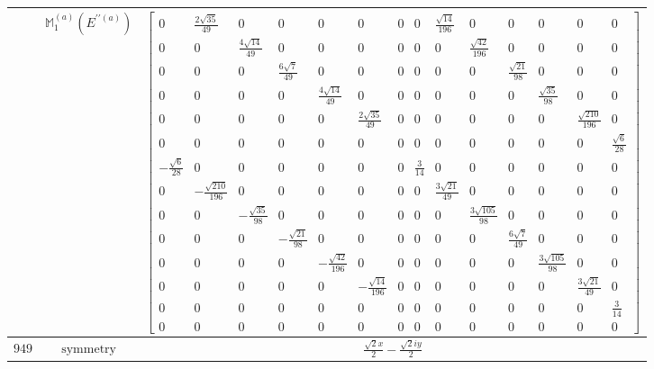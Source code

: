 \documentclass[fleqn,8pt,landscape]{jsarticle}
\begin{document}
\begin{longtable}{ccc}
$  $ & $ \mathbb{M}_{1}^{(a)}(E^{\prime\prime(a)}) $ & $ \begin{bmatrix} 0 & \frac{2 \sqrt{35}}{49} & 0 & 0 & 0 & 0 & 0 & 0 & \frac{\sqrt{14}}{196} & 0 & 0 & 0 & 0 & 0 \\ 0 & 0 & \frac{4 \sqrt{14}}{49} & 0 & 0 & 0 & 0 & 0 & 0 & \frac{\sqrt{42}}{196} & 0 & 0 & 0 & 0 \\ 0 & 0 & 0 & \frac{6 \sqrt{7}}{49} & 0 & 0 & 0 & 0 & 0 & 0 & \frac{\sqrt{21}}{98} & 0 & 0 & 0 \\ 0 & 0 & 0 & 0 & \frac{4 \sqrt{14}}{49} & 0 & 0 & 0 & 0 & 0 & 0 & \frac{\sqrt{35}}{98} & 0 & 0 \\ 0 & 0 & 0 & 0 & 0 & \frac{2 \sqrt{35}}{49} & 0 & 0 & 0 & 0 & 0 & 0 & \frac{\sqrt{210}}{196} & 0 \\ 0 & 0 & 0 & 0 & 0 & 0 & 0 & 0 & 0 & 0 & 0 & 0 & 0 & \frac{\sqrt{6}}{28} \\ - \frac{\sqrt{6}}{28} & 0 & 0 & 0 & 0 & 0 & 0 & \frac{3}{14} & 0 & 0 & 0 & 0 & 0 & 0 \\ 0 & - \frac{\sqrt{210}}{196} & 0 & 0 & 0 & 0 & 0 & 0 & \frac{3 \sqrt{21}}{49} & 0 & 0 & 0 & 0 & 0 \\ 0 & 0 & - \frac{\sqrt{35}}{98} & 0 & 0 & 0 & 0 & 0 & 0 & \frac{3 \sqrt{105}}{98} & 0 & 0 & 0 & 0 \\ 0 & 0 & 0 & - \frac{\sqrt{21}}{98} & 0 & 0 & 0 & 0 & 0 & 0 & \frac{6 \sqrt{7}}{49} & 0 & 0 & 0 \\ 0 & 0 & 0 & 0 & - \frac{\sqrt{42}}{196} & 0 & 0 & 0 & 0 & 0 & 0 & \frac{3 \sqrt{105}}{98} & 0 & 0 \\ 0 & 0 & 0 & 0 & 0 & - \frac{\sqrt{14}}{196} & 0 & 0 & 0 & 0 & 0 & 0 & \frac{3 \sqrt{21}}{49} & 0 \\ 0 & 0 & 0 & 0 & 0 & 0 & 0 & 0 & 0 & 0 & 0 & 0 & 0 & \frac{3}{14} \\ 0 & 0 & 0 & 0 & 0 & 0 & 0 & 0 & 0 & 0 & 0 & 0 & 0 & 0 \end{bmatrix} $ \\ \hline
$ 949 $ & $ \text{symmetry} $ & $ \frac{\sqrt{2} x}{2} - \frac{\sqrt{2} i y}{2} $ \\

\end{longtable}
\end{document}
